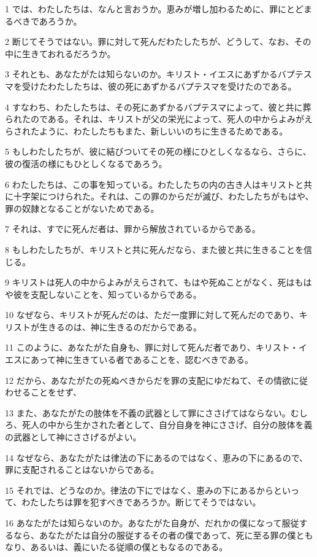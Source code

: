 \par 1 では、わたしたちは、なんと言おうか。恵みが増し加わるために、罪にとどまるべきであろうか。
\par 2 断じてそうではない。罪に対して死んだわたしたちが、どうして、なお、その中に生きておれるだろうか。
\par 3 それとも、あなたがたは知らないのか。キリスト・イエスにあずかるバプテスマを受けたわたしたちは、彼の死にあずかるバプテスマを受けたのである。
\par 4 すなわち、わたしたちは、その死にあずかるバプテスマによって、彼と共に葬られたのである。それは、キリストが父の栄光によって、死人の中からよみがえらされたように、わたしたちもまた、新しいいのちに生きるためである。
\par 5 もしわたしたちが、彼に結びついてその死の様にひとしくなるなら、さらに、彼の復活の様にもひとしくなるであろう。
\par 6 わたしたちは、この事を知っている。わたしたちの内の古き人はキリストと共に十字架につけられた。それは、この罪のからだが滅び、わたしたちがもはや、罪の奴隷となることがないためである。
\par 7 それは、すでに死んだ者は、罪から解放されているからである。
\par 8 もしわたしたちが、キリストと共に死んだなら、また彼と共に生きることを信じる。
\par 9 キリストは死人の中からよみがえらされて、もはや死ぬことがなく、死はもはや彼を支配しないことを、知っているからである。
\par 10 なぜなら、キリストが死んだのは、ただ一度罪に対して死んだのであり、キリストが生きるのは、神に生きるのだからである。
\par 11 このように、あなたがた自身も、罪に対して死んだ者であり、キリスト・イエスにあって神に生きている者であることを、認むべきである。
\par 12 だから、あなたがたの死ぬべきからだを罪の支配にゆだねて、その情欲に従わせることをせず、
\par 13 また、あなたがたの肢体を不義の武器として罪にささげてはならない。むしろ、死人の中から生かされた者として、自分自身を神にささげ、自分の肢体を義の武器として神にささげるがよい。
\par 14 なぜなら、あなたがたは律法の下にあるのではなく、恵みの下にあるので、罪に支配されることはないからである。
\par 15 それでは、どうなのか。律法の下にではなく、恵みの下にあるからといって、わたしたちは罪を犯すべきであろうか。断じてそうではない。
\par 16 あなたがたは知らないのか。あなたがた自身が、だれかの僕になって服従するなら、あなたがたは自分の服従するその者の僕であって、死に至る罪の僕ともなり、あるいは、義にいたる従順の僕ともなるのである。
